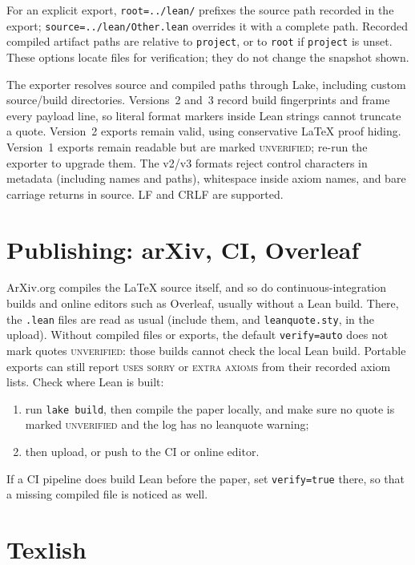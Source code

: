 \documentclass[11pt]{article}
\newcommand{\opt}[1]{\texttt{#1}}
\begin{document}
For an explicit export, \opt{root=../lean/} prefixes the source path recorded in the
export; \opt{source=../lean/Other.lean} overrides it with a complete path.
Recorded compiled artifact paths are relative to \opt{project}, or to \opt{root} if
\opt{project} is unset. These options locate files for verification; they do not
change the snapshot shown.

The exporter resolves source and compiled paths through Lake, including custom source/build
directories. Versions~2 and~3 record build fingerprints and frame every payload line, so
literal format markers inside Lean strings cannot truncate a quote. Version~2 exports
remain valid, using conservative \LaTeX{} proof hiding. Version~1 exports remain readable
but are marked \textsc{unverified}; re-run the exporter to upgrade them.
The v2/v3 formats reject control characters in metadata (including names and paths),
whitespace inside axiom names, and bare carriage returns in source. LF and CRLF are supported.

\section{Publishing: arXiv, CI, Overleaf}\label{sec:publishing}

ArXiv.org compiles the \LaTeX{} source itself, and so do continuous-integration builds and online
editors such as Overleaf, usually without a Lean build. There, the \texttt{.lean} files are
read as usual (include them, and \texttt{leanquote.sty}, in the upload). Without compiled
files or exports, the default \opt{verify=auto} does not mark quotes \textsc{unverified}:
those builds cannot check the local Lean build. Portable exports can still report
\textsc{uses sorry} or \textsc{extra axioms} from their recorded axiom lists.
Check where Lean is built:
\begin{enumerate}
\item run \texttt{lake build}, then compile the paper locally, and make sure no quote is
  marked \textsc{unverified} and the log has no \textsf{leanquote} warning;
\item then upload, or push to the CI or online editor.
\end{enumerate}
If a CI pipeline does build Lean before the paper, set \opt{verify=true} there, so that a
missing compiled file is noticed as well.

\section{Texlish}
\end{document}
